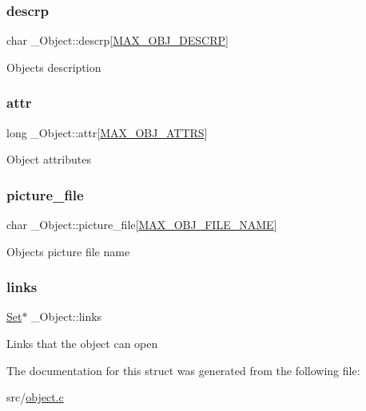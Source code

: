 \subsubsection{\texorpdfstring{descrp}{descrp}}
{\footnotesize\ttfamily char \+\_\+\+Object\+::descrp\mbox{[}\hyperlink{object_8h_a9c396da2f3b9f0191120ff1666af6381}{M\+A\+X\+\_\+\+O\+B\+J\+\_\+\+D\+E\+S\+C\+RP}\mbox{]}}

Object\textquotesingle{}s description \mbox{\label{struct__Object_a9074217e572100d1259487a818bb0a0a}} 
\subsubsection{\texorpdfstring{attr}{attr}}
{\footnotesize\ttfamily long \+\_\+\+Object\+::attr\mbox{[}\hyperlink{object_8h_a6b252b064231d7dc71c194dfea24b32b}{M\+A\+X\+\_\+\+O\+B\+J\+\_\+\+A\+T\+T\+RS}\mbox{]}}

Object attributes \mbox{\label{struct__Object_af8990f408c6f3706835f7163b425e47b}} 
\subsubsection{\texorpdfstring{picture\+\_\+file}{picture\_file}}
{\footnotesize\ttfamily char \+\_\+\+Object\+::picture\+\_\+file\mbox{[}\hyperlink{object_8h_aa9e64066438f277a4c1e56c3037c4f2d}{M\+A\+X\+\_\+\+O\+B\+J\+\_\+\+F\+I\+L\+E\+\_\+\+N\+A\+ME}\mbox{]}}

Object\textquotesingle{}s picture file name \mbox{\label{struct__Object_afd29bc78dd0fc104db1aab87c6fc7d5c}} 
\subsubsection{\texorpdfstring{links}{links}}
{\footnotesize\ttfamily \hyperlink{set_8h_a6d3b7f7c92cbb4577ef3ef7ddbf93161}{Set}$\ast$ \+\_\+\+Object\+::links}

Links that the object can open 

The documentation for this struct was generated from the following file\+:\begin{DoxyCompactItemize}
\item 
src/\hyperlink{object_8c}{object.\+c}\end{DoxyCompactItemize}
